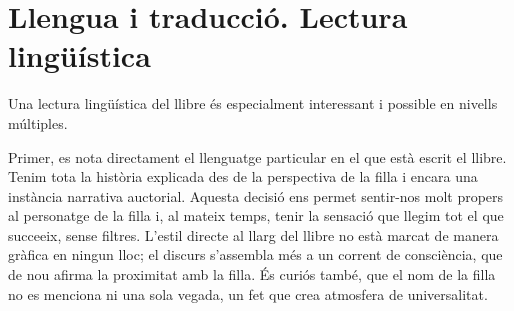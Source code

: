 \section{Llengua i traducció. Lectura lingüística}

Una lectura lingüística del llibre és especialment interessant i possible en nivells múltiples.

Primer, es nota directament el llenguatge particular en el que està escrit el llibre.
Tenim tota la història explicada des de la perspectiva de la filla i encara una instància narrativa auctorial.
Aquesta decisió ens permet sentir-nos molt propers al personatge de la filla i, al mateix temps, tenir la sensació que llegim tot el que succeeix, sense filtres.
L'estil directe al llarg del llibre no està marcat de manera gràfica en ningun lloc; el discurs s'assembla més a un corrent de consciència, que de nou afirma la proximitat amb la filla.
És curiós també, que el nom de la filla no es menciona ni una sola vegada, un fet que crea atmosfera de universalitat.




